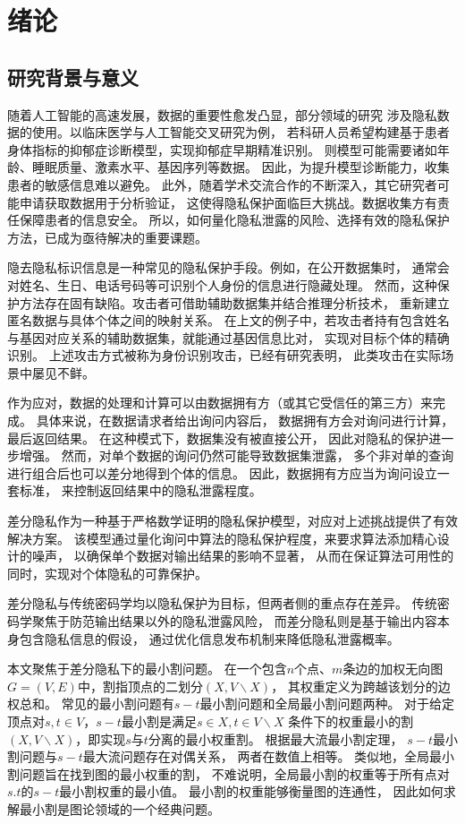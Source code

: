 \chapter{绪论}
\label{chap:introduction}
\section{研究背景与意义}

随着人工智能的高速发展，数据的重要性愈发凸显，部分领域的研究
涉及隐私数据的使用。以临床医学与人工智能交叉研究为例，
若科研人员希望构建基于患者身体指标的抑郁症诊断模型，实现抑郁症早期精准识别。
则模型可能需要诸如年龄、睡眠质量、激素水平、基因序列等数据。
因此，为提升模型诊断能力，收集患者的敏感信息难以避免。
此外，随着学术交流合作的不断深入，其它研究者可能申请获取数据用于分析验证，
这使得隐私保护面临巨大挑战。数据收集方有责任保障患者的信息安全。
所以，如何量化隐私泄露的风险、选择有效的隐私保护方法，已成为亟待解决的重要课题。

隐去隐私标识信息是一种常见的隐私保护手段。例如，在公开数据集时，
通常会对姓名、生日、电话号码等可识别个人身份的信息进行隐藏处理。
然而，这种保护方法存在固有缺陷。攻击者可借助辅助数据集并结合推理分析技术，
重新建立匿名数据与具体个体之间的映射关系。
在上文的例子中，若攻击者持有包含姓名与基因对应关系的辅助数据集，就能通过基因信息比对，
实现对目标个体的精确识别。
上述攻击方式被称为身份识别攻击，已经有研究表明，
此类攻击在实际场景中屡见不鲜。\cite{narayanan2016precautionary}

作为应对，数据的处理和计算可以由数据拥有方（或其它受信任的第三方）来完成。
具体来说，在数据请求者给出询问内容后，
数据拥有方会对询问进行计算，最后返回结果。
在这种模式下，数据集没有被直接公开，
因此对隐私的保护进一步增强。
然而，对单个数据的询问仍然可能导致数据集泄露，
多个非对单的查询进行组合后也可以差分地得到个体的信息。\cite{dinur2003revealing}
因此，数据拥有方应当为询问设立一套标准，
来控制返回结果中的隐私泄露程度。

差分隐私作为一种基于严格数学证明的隐私保护模型，对应对上述挑战提供了有效解决方案。
该模型通过量化询问中算法的隐私保护程度，来要求算法添加精心设计的噪声，
以确保单个数据对输出结果的影响不显著，
从而在保证算法可用性的同时，实现对个体隐私的可靠保护。\cite{vadhan2017complexity}

差分隐私与传统密码学均以隐私保护为目标，但两者侧的重点存在差异。
传统密码学聚焦于防范输出结果以外的隐私泄露风险，
而差分隐私则是基于输出内容本身包含隐私信息的假设，
通过优化信息发布机制来降低隐私泄露概率。

本文聚焦于差分隐私下的最小割问题。
在一个包含$n$个点、$m$条边的加权无向图$G=(V,E)$中，割指顶点的二划分$(X,V\backslash X)$，
其权重定义为跨越该划分的边权总和。
常见的最小割问题有$s-t$最小割问题和全局最小割问题两种。
对于给定顶点对$s,t\in V$，$s-t$最小割是满足$s\in X,t\in V\backslash X$
条件下的权重最小的割$(X,V\backslash X)$，即实现$s$与$t$分离的最小权重割。
根据最大流最小割定理，
$s-t$最小割问题与$s-t$最大流问题存在对偶关系，
两者在数值上相等。\cite{ford1956maximal}
类似地，全局最小割问题旨在找到图的最小权重的割，
不难说明，全局最小割的权重等于所有点对$s.t$的$s-t$最小割权重的最小值。
最小割的权重能够衡量图的连通性，
因此如何求解最小割是图论领域的一个经典问题。


